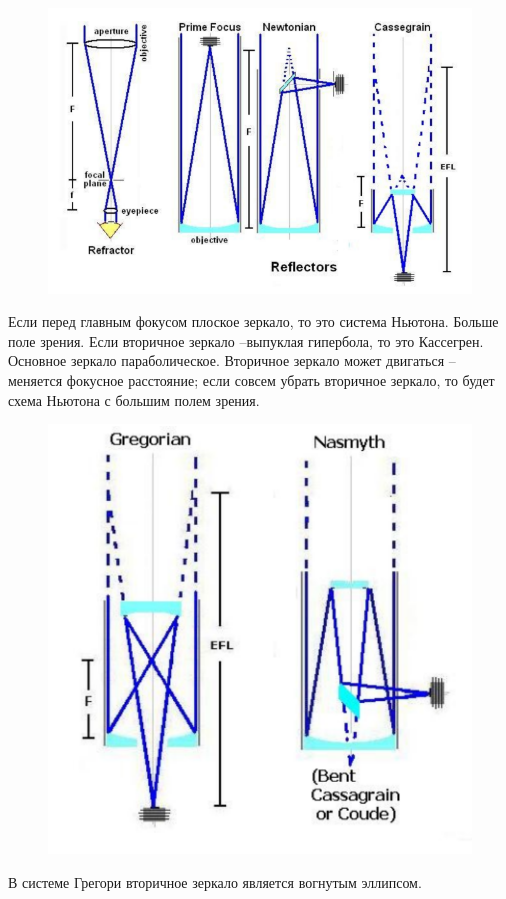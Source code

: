 \documentclass[12pt]{article}
\begin{document}
\begin{figure}[h]
	\centering
	\includegraphics[width=0.7\linewidth]{"Снимок экрана от 2024-12-22 17-45-41"}
\end{figure}

Если перед главным фокусом плоское зеркало, то это система Ньютона. Больше поле зрения.
Если вторичное зеркало --выпуклая гипербола, то это Кассегрен. Основное зеркало параболическое. Вторичное зеркало может двигаться – меняется фокусное расстояние;
если совсем убрать вторичное зеркало, то будет схема Ньютона с большим полем зрения.


\begin{figure}[h]
	\centering
	\includegraphics[width=0.4\linewidth]{"Снимок экрана от 2024-12-22 17-45-07"}
\end{figure}

В системе Грегори вторичное зеркало является вогнутым эллипсом.\newpage
\end{document}
